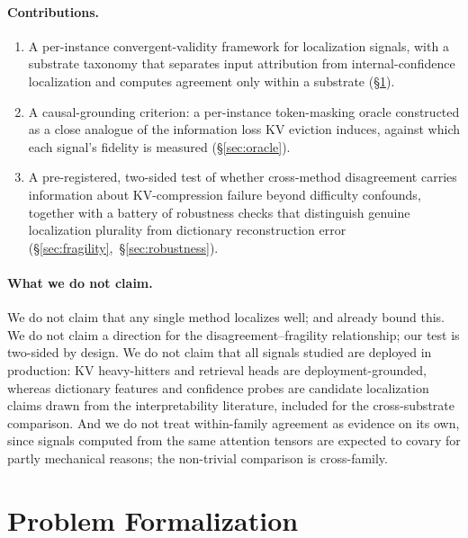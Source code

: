\documentclass[11pt]{article}
\begin{document}
\paragraph{Contributions.}
\begin{enumerate}
  \item A per-instance convergent-validity framework for localization
  signals, with a substrate taxonomy that separates input attribution from
  internal-confidence localization and computes agreement only within a
  substrate (\S\ref{sec:formalization}).
  \item A causal-grounding criterion: a per-instance token-masking oracle
  constructed as a close analogue of the information loss KV eviction
  induces, against which each signal's fidelity is measured
  (\S\ref{sec:oracle}).
  \item A pre-registered, two-sided test of whether cross-method
  disagreement carries information about KV-compression failure beyond
  difficulty confounds, together with a battery of robustness checks that
  distinguish genuine localization plurality from dictionary
  reconstruction error (\S\ref{sec:fragility},~\S\ref{sec:robustness}).
\end{enumerate}

\paragraph{What we do not claim.}
We do not claim that any single method localizes well; \citet{hase2023} and
\citet{kantamneni2025} already bound this. We do not claim a direction for
the disagreement--fragility relationship; our test is two-sided by design.
We do not claim that all signals studied are deployed in production: KV
heavy-hitters and retrieval heads are deployment-grounded, whereas
dictionary features and confidence probes are candidate localization claims
drawn from the interpretability literature, included for the cross-substrate
comparison. And we do not treat within-family agreement as evidence on its
own, since signals computed from the same attention tensors are expected to
covary for partly mechanical reasons; the non-trivial comparison is
cross-family.

\section{Problem Formalization}
\label{sec:formalization}
\end{document}
